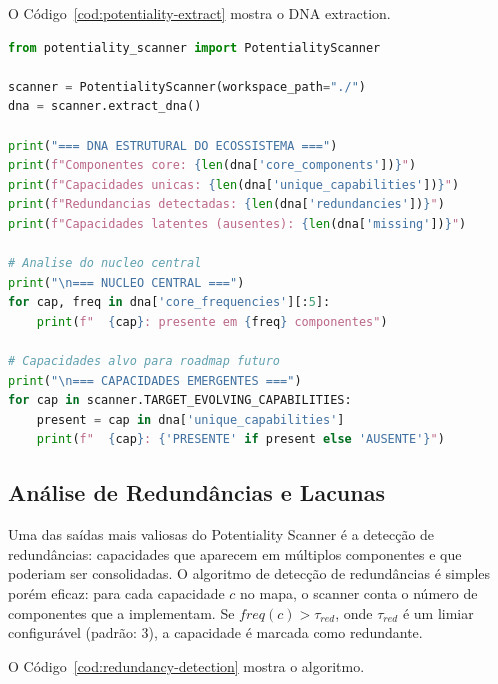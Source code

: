 O Código~\ref{cod:potentiality-extract} mostra o DNA extraction.

\begin{lstlisting}[caption={Extracao do DNA estrutural do ecossistema
pelo Potentiality Scanner.},
label={cod:potentiality-extract}, style=pythonstyle, language=Python]
from potentiality_scanner import PotentialityScanner

scanner = PotentialityScanner(workspace_path="./")
dna = scanner.extract_dna()

print("=== DNA ESTRUTURAL DO ECOSSISTEMA ===")
print(f"Componentes core: {len(dna['core_components'])}")
print(f"Capacidades unicas: {len(dna['unique_capabilities'])}")
print(f"Redundancias detectadas: {len(dna['redundancies'])}")
print(f"Capacidades latentes (ausentes): {len(dna['missing'])}")

# Analise do nucleo central
print("\n=== NUCLEO CENTRAL ===")
for cap, freq in dna['core_frequencies'][:5]:
    print(f"  {cap}: presente em {freq} componentes")

# Capacidades alvo para roadmap futuro
print("\n=== CAPACIDADES EMERGENTES ===")
for cap in scanner.TARGET_EVOLVING_CAPABILITIES:
    present = cap in dna['unique_capabilities']
    print(f"  {cap}: {'PRESENTE' if present else 'AUSENTE'}")
\end{lstlisting}

\subsection{Análise de Redundâncias e Lacunas}

Uma das saídas mais valiosas do Potentiality Scanner é a detecção de
redundâncias: capacidades que aparecem em múltiplos componentes e que
poderiam ser consolidadas. O algoritmo de detecção de redundâncias é
simples porém eficaz: para cada capacidade $c$ no mapa, o scanner conta
o número de componentes que a implementam. Se $freq(c) > \tau_{red}$,
onde $\tau_{red}$ é um limiar configurável (padrão: 3), a capacidade é
marcada como redundante.

O Código~\ref{cod:redundancy-detection} mostra o algoritmo.

